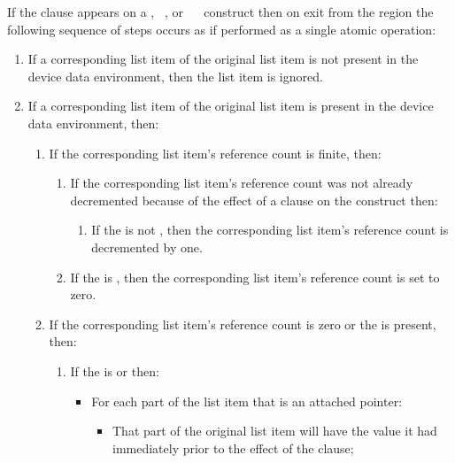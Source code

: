 If the  clause appears on a , ~, or ~~ construct then on exit from the region the following sequence of steps occurs as if performed as a single atomic operation:
\begin{enumerate}
\item If a corresponding list item of the original list item is not present in the device data environment, then the list item is ignored.
\item If a corresponding list item of the original list item is present in the device data environment, then:
\begin{enumerate}

\item If the corresponding list item's reference count is finite, then:
\begin{enumerate}
\item If the corresponding list item's reference count was not already
decremented because of the effect of a  clause on the
construct then:
\begin{enumerate}
\item If the  is not , then the corresponding list
                item's reference count is decremented by one.
\end{enumerate}
\item If the  is , then the corresponding list item's reference count is set to zero.
\end{enumerate}

\item If the corresponding list item's reference count is zero or the   is present, then:
\begin{enumerate}
\item If the  is  or  then:
\begin{itemize}

              \item For each part of the list item that is an attached pointer:  \begin{itemize}

                  \item That part of the original list item will
                    have the value it had immediately prior to the effect of the  clause;

                \end{itemize}


\end{itemize}
\end{enumerate}
\end{enumerate}
\end{enumerate}
